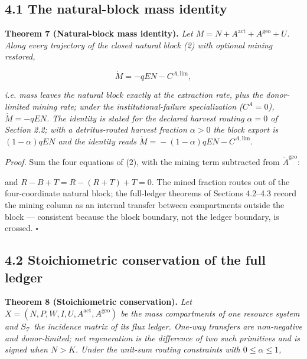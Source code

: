 \documentclass[11pt]{article}
\begin{document}
\subsection*{4.1 The natural-block mass identity}\label{41-the-natural-block-mass-identity}

\textbf{Theorem 7 (Natural-block mass identity).} \emph{Let \(M =\allowbreak{} N +\allowbreak{} A^{\mathrm{act}} +\allowbreak{} A^{\mathrm{geo}} +\allowbreak{} U\). Along every trajectory of the closed natural block (2) with optional mining restored,} 

$$\dot M = -qEN - C^{A,\mathrm{lim}},$$

 \emph{i.e. mass leaves the natural block exactly at the extraction rate, plus the donor-limited mining rate; under the institutional-failure specialization (\(C^A = 0\)), \(\dot M = -qEN\). The identity is stated for the declared harvest routing \(\alpha = 0\) of Section 2.2; with a detritus-routed harvest fraction \(\alpha > 0\) the block export is \((1-\alpha)qEN\) and the identity reads \(\dot M =\allowbreak{} -(1-\alpha)qEN - C^{A,\allowbreak{}\mathrm{lim}}\).}

\emph{Proof.} Sum the four equations of (2), with the mining term subtracted from \(\dot A^{\mathrm{geo}}\): 

\par\noindent{}\par

 and \(R - B +\allowbreak{} T =\allowbreak{} R - (R +\allowbreak{} T) +\allowbreak{} T =\allowbreak{} 0\). The mined fraction routes out of the four-coordinate natural block; the full-ledger theorems of Sections 4.2--4.3 record the mining column as an internal transfer between compartments outside the block --- consistent because the block boundary, not the ledger boundary, is crossed. \(\square\)

\subsection*{4.2 Stoichiometric conservation of the full ledger}\label{42-stoichiometric-conservation-of-the-full-ledger}

\textbf{Theorem 8 (Stoichiometric conservation).} \emph{Let \(X =\allowbreak{} (N,\allowbreak{} P,\allowbreak{} W,\allowbreak{} I,\allowbreak{} U,\allowbreak{} A^{\mathrm{act}},\allowbreak{} A^{\mathrm{geo}})\) be the mass compartments of one resource system and \(S_{\mathcal{T}}\) the incidence matrix of its flux ledger. One-way transfers are non-negative and donor-limited; net regeneration is the difference of two such primitives and is signed when \(N > K\). Under the unit-sum routing constraints with \(0 \le \alpha \le 1\),} 
\end{document}
